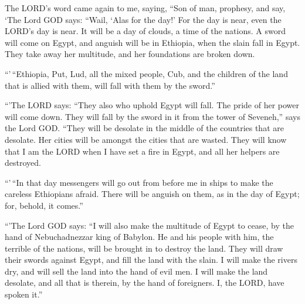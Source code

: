  The LORD's word came again to me, saying, 
``Son of man, prophesy, and say, `The Lord GOD says: ``Wail, `Alas for
the day!'  For the day is near, even the LORD's day is near.
It will be a day of clouds, a time of the nations.  A sword
will come on Egypt, and anguish will be in Ethiopia, when the slain fall
in Egypt. They take away her multitude, and her foundations are broken
down.

 ``'\,``Ethiopia, Put, Lud, all the mixed people, Cub, and
the children of the land that is allied with them, will fall with them
by the sword.''

 ``'The LORD says: ``They also who uphold Egypt will fall.
The pride of her power will come down. They will fall by the sword in it
from the tower of Seveneh,'' says the Lord GOD.  ``They will
be desolate in the middle of the countries that are desolate. Her cities
will be amongst the cities that are wasted.  They will know
that I am the LORD when I have set a fire in Egypt, and all her helpers
are destroyed.

 ``'\,``In that day messengers will go out from before me in
ships to make the careless Ethiopians afraid. There will be anguish on
them, as in the day of Egypt; for, behold, it comes.''

 ``'The Lord GOD says: ``I will also make the multitude of
Egypt to cease, by the hand of Nebuchadnezzar king of Babylon.
 He and his people with him, the terrible of the nations,
will be brought in to destroy the land. They will draw their swords
against Egypt, and fill the land with the slain.  I will
make the rivers dry, and will sell the land into the hand of evil men. I
will make the land desolate, and all that is therein, by the hand of
foreigners. I, the LORD, have spoken it.''

